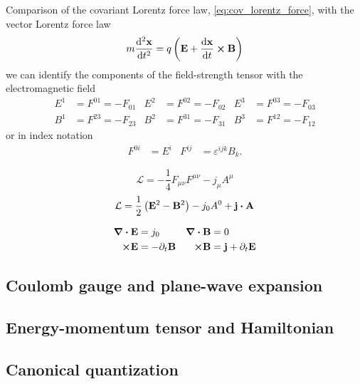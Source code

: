 Comparison of the covariant Lorentz force law, \cref{eq:cov_lorentz_force}, with the vector Lorentz force law
\begin{equation}
	m
	\dv[2]{\vb{x}}{t}
	=
	q\left(
		\vb{E}
		+
		\dv{\vb{x}}{t}
		\cp
		\vb{B}
	\right)
\end{equation}
we can identify the components of the field-strength tensor with the electromagnetic field~\cite[p.~245]{Zee2013}
\begin{align}
	E^1
	&=
	F^{01}
	=
	-
	F_{01}
	&
	E^2
	&=
	F^{02}
	=
	-
	F_{02}
	&
	E^3
	&=
	F^{03}
	=
	-
	F_{03}
	\\
	B^1
	&=
	F^{23}
	=
	-
	F_{23}
	&
	B^2
	&=
	F^{31}
	=
	-
	F_{31}
	&
	B^3
	&=
	F^{12}
	=
	-
	F_{12}
\end{align}
or in index notation
\begin{align}
	F^{0i}
	&=
	E^i
	&
	F^{ij}
	&=
	\varepsilon^{ijk}
	B_k
	.
\end{align}

\begin{equation}
	\mathcal{L}
	=
	-
	\frac{1}{4}
	F_{\mu\nu}
	F^{\mu\nu}
	-
	j_\mu A^\mu
\end{equation}
\begin{equation}
	\mathcal{L}
	=
	\frac{1}{2}
	\left(
		\vb{E}^2
		-
		\vb{B}^2
	\right)
	-
	j_0A^0
	+
	\vb{j}
	\vdot
	\vb{A}
\end{equation}

\begin{align}
	\div\vb{E}
	&=
	j_0
	&
	\div\vb{B}
	&=
	0
	\\
	\cp\vb{E}
	&=
	-\partial_t\vb{B}
	&
	\cp\vb{B}
	&=
	\vb{j}
	+
	\partial_t\vb{E}
\end{align}

\subsection{Coulomb gauge and plane-wave expansion}


\subsection{Energy-momentum tensor and Hamiltonian}

\subsection{Canonical quantization}

